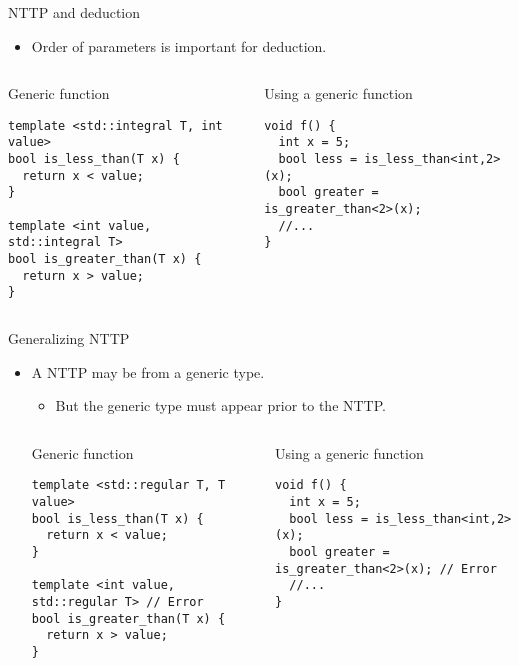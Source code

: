 \begin{frame}[t,fragile]{NTTP and deduction}
\begin{itemize}
  \item Order of parameters is important for deduction.
\end{itemize}

\begin{columns}[T]

\begin{block}{Generic function}
\begin{lstlisting}
template <std::integral T, int value>
bool is_less_than(T x) {
  return x < value;
}

template <int value, std::integral T>
bool is_greater_than(T x) {
  return x > value;
}
\end{lstlisting}
\end{block}

\begin{block}{Using a generic function}
\begin{lstlisting}
void f() {
  int x = 5;
  bool less = is_less_than<int,2>(x);
  bool greater = is_greater_than<2>(x);
  //...
}
\end{lstlisting}
\end{block}

\end{columns}

\end{frame}

\begin{frame}[t,fragile]{Generalizing NTTP}
\begin{itemize}
  \item A NTTP may be from a generic type.
    \begin{itemize}
      \item But the generic type must appear prior to the NTTP.
    \end{itemize}

\begin{columns}[T]

\begin{block}{Generic function}
\begin{lstlisting}
template <std::regular T, T value>
bool is_less_than(T x) {
  return x < value;
}

template <int value, std::regular T> // Error
bool is_greater_than(T x) {
  return x > value;
}
\end{lstlisting}
\end{block}

\begin{block}{Using a generic function}
\begin{lstlisting}
void f() {
  int x = 5;
  bool less = is_less_than<int,2>(x);
  bool greater = is_greater_than<2>(x); // Error
  //...
}
\end{lstlisting}
\end{block}

\end{columns}

\end{itemize}
\end{frame}

